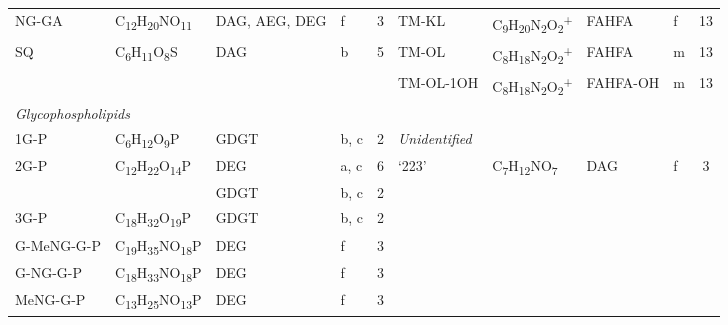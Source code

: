 \begin{landscape}
\begin{table}
\begin{adjustbox}{width=\textheight,keepaspectratio}
\begin{threeparttable}
\begin{tabular}{lrllcrrrrr}
NG-GA & \multicolumn{1}{l}{C\textsubscript{12}H\textsubscript{20}NO\textsubscript{11}} & DAG, AEG, DEG & f     & 3     & \multicolumn{1}{l}{TM-KL} & \multicolumn{1}{l}{C\textsubscript{9}H\textsubscript{20}N\textsubscript{2}O\textsubscript{2}\textsuperscript{+}} & \multicolumn{1}{l}{FAHFA} & \multicolumn{1}{l}{f} & \multicolumn{1}{c}{13} \\
SQ    & \multicolumn{1}{l}{C\textsubscript{6}H\textsubscript{11}O\textsubscript{8}S} & DAG   & b     & 5     & \multicolumn{1}{l}{TM-OL} & \multicolumn{1}{l}{C\textsubscript{8}H\textsubscript{18}N\textsubscript{2}O\textsubscript{2}\textsuperscript{+}} & \multicolumn{1}{l}{FAHFA} & \multicolumn{1}{l}{m} & \multicolumn{1}{c}{13} \\
      &       &       &       &       & \multicolumn{1}{l}{TM-OL-1OH} & \multicolumn{1}{l}{C\textsubscript{8}H\textsubscript{18}N\textsubscript{2}O\textsubscript{2}\textsuperscript{+}} & \multicolumn{1}{l}{FAHFA-OH} & \multicolumn{1}{l}{m} & \multicolumn{1}{c}{13} \\
\multicolumn{2}{l}{\textit{Glycophospholipids}} &       &       &       &       &       &       &       &  \\
1G-P  & \multicolumn{1}{l}{C\textsubscript{6}H\textsubscript{12}O\textsubscript{9}P} & GDGT  & b, c  & 2     & \multicolumn{2}{l}{\textit{Unidentified}} &       &       &  \\
2G-P  & \multicolumn{1}{l}{C\textsubscript{12}H\textsubscript{22}O\textsubscript{14}P} & DEG   & a, c  & 6     & \multicolumn{1}{l}{`223'} & \multicolumn{1}{l}{C\textsubscript{7}H\textsubscript{12}NO\textsubscript{7}} & \multicolumn{1}{l}{DAG} & \multicolumn{1}{l}{f} & \multicolumn{1}{c}{3} \\
      &       & GDGT  & b, c  & 2     &       &       &       &       &  \\
3G-P  & \multicolumn{1}{l}{C\textsubscript{18}H\textsubscript{32}O\textsubscript{19}P} & GDGT  & b, c  & 2     &       &       &       &       &  \\
G-MeNG-G-P & \multicolumn{1}{l}{C\textsubscript{19}H\textsubscript{35}NO\textsubscript{18}P} & DEG   & f     & 3     &       &       &       &       &  \\
G-NG-G-P & \multicolumn{1}{l}{C\textsubscript{18}H\textsubscript{33}NO\textsubscript{18}P} & DEG   & f     & 3     &       &       &       &       &  \\
MeNG-G-P & \multicolumn{1}{l}{C\textsubscript{13}H\textsubscript{25}NO\textsubscript{13}P} & DEG   & f     & 3     &       &       &       &       &  \\

\end{tabular}
\end{threeparttable}
\end{adjustbox}
\end{table}
\end{landscape}

